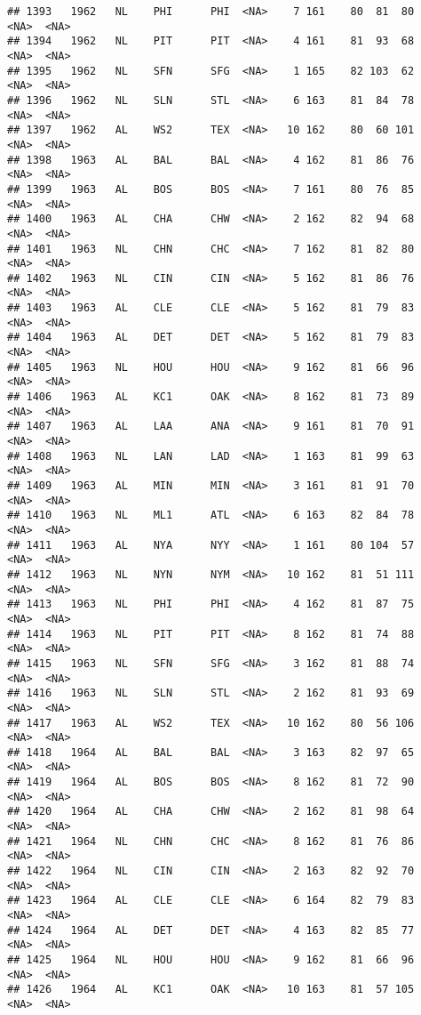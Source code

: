\documentclass[]{article}
\begin{document}
\begin{verbatim}
## 1393   1962   NL    PHI      PHI  <NA>    7 161    80  81  80   <NA>  <NA>
## 1394   1962   NL    PIT      PIT  <NA>    4 161    81  93  68   <NA>  <NA>
## 1395   1962   NL    SFN      SFG  <NA>    1 165    82 103  62   <NA>  <NA>
## 1396   1962   NL    SLN      STL  <NA>    6 163    81  84  78   <NA>  <NA>
## 1397   1962   AL    WS2      TEX  <NA>   10 162    80  60 101   <NA>  <NA>
## 1398   1963   AL    BAL      BAL  <NA>    4 162    81  86  76   <NA>  <NA>
## 1399   1963   AL    BOS      BOS  <NA>    7 161    80  76  85   <NA>  <NA>
## 1400   1963   AL    CHA      CHW  <NA>    2 162    82  94  68   <NA>  <NA>
## 1401   1963   NL    CHN      CHC  <NA>    7 162    81  82  80   <NA>  <NA>
## 1402   1963   NL    CIN      CIN  <NA>    5 162    81  86  76   <NA>  <NA>
## 1403   1963   AL    CLE      CLE  <NA>    5 162    81  79  83   <NA>  <NA>
## 1404   1963   AL    DET      DET  <NA>    5 162    81  79  83   <NA>  <NA>
## 1405   1963   NL    HOU      HOU  <NA>    9 162    81  66  96   <NA>  <NA>
## 1406   1963   AL    KC1      OAK  <NA>    8 162    81  73  89   <NA>  <NA>
## 1407   1963   AL    LAA      ANA  <NA>    9 161    81  70  91   <NA>  <NA>
## 1408   1963   NL    LAN      LAD  <NA>    1 163    81  99  63   <NA>  <NA>
## 1409   1963   AL    MIN      MIN  <NA>    3 161    81  91  70   <NA>  <NA>
## 1410   1963   NL    ML1      ATL  <NA>    6 163    82  84  78   <NA>  <NA>
## 1411   1963   AL    NYA      NYY  <NA>    1 161    80 104  57   <NA>  <NA>
## 1412   1963   NL    NYN      NYM  <NA>   10 162    81  51 111   <NA>  <NA>
## 1413   1963   NL    PHI      PHI  <NA>    4 162    81  87  75   <NA>  <NA>
## 1414   1963   NL    PIT      PIT  <NA>    8 162    81  74  88   <NA>  <NA>
## 1415   1963   NL    SFN      SFG  <NA>    3 162    81  88  74   <NA>  <NA>
## 1416   1963   NL    SLN      STL  <NA>    2 162    81  93  69   <NA>  <NA>
## 1417   1963   AL    WS2      TEX  <NA>   10 162    80  56 106   <NA>  <NA>
## 1418   1964   AL    BAL      BAL  <NA>    3 163    82  97  65   <NA>  <NA>
## 1419   1964   AL    BOS      BOS  <NA>    8 162    81  72  90   <NA>  <NA>
## 1420   1964   AL    CHA      CHW  <NA>    2 162    81  98  64   <NA>  <NA>
## 1421   1964   NL    CHN      CHC  <NA>    8 162    81  76  86   <NA>  <NA>
## 1422   1964   NL    CIN      CIN  <NA>    2 163    82  92  70   <NA>  <NA>
## 1423   1964   AL    CLE      CLE  <NA>    6 164    82  79  83   <NA>  <NA>
## 1424   1964   AL    DET      DET  <NA>    4 163    82  85  77   <NA>  <NA>
## 1425   1964   NL    HOU      HOU  <NA>    9 162    81  66  96   <NA>  <NA>
## 1426   1964   AL    KC1      OAK  <NA>   10 163    81  57 105   <NA>  <NA>

\end{verbatim}
\end{document}

